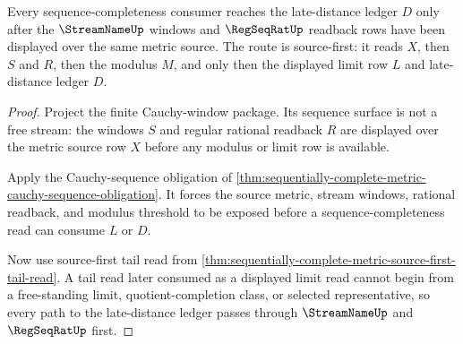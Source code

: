 \begin{theorem}
\label{thm:sequentially-complete-metric-regseqrat-source-route}
Every sequence-completeness consumer reaches the late-distance ledger $D$ only after the $\StreamNameUp$ windows and $\RegSeqRatUp$ readback rows have been displayed over the same metric source. The route is source-first: it reads $X$, then $S$ and $R$, then the modulus $M$, and only then the displayed limit row $L$ and late-distance ledger $D$.
\end{theorem}
\begin{proof}
Project the finite Cauchy-window package. Its sequence surface is not a free stream: the windows $S$ and regular rational readback $R$ are displayed over the metric source row $X$ before any modulus or limit row is available.

Apply the Cauchy-sequence obligation of \autoref{thm:sequentially-complete-metric-cauchy-sequence-obligation}. It forces the source metric, stream windows, rational readback, and modulus threshold to be exposed before a sequence-completeness read can consume $L$ or $D$.

Now use source-first tail read from \autoref{thm:sequentially-complete-metric-source-first-tail-read}. A tail read later consumed as a displayed limit read cannot begin from a free-standing limit, quotient-completion class, or selected representative, so every path to the late-distance ledger passes through $\StreamNameUp$ and $\RegSeqRatUp$ first.
\end{proof}

